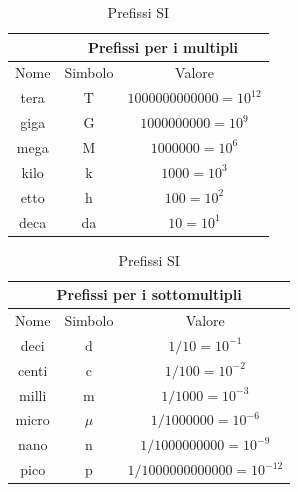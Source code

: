 \begin{table}
	\begin{center}
		\begin{tabular}{ccc}
			\toprule
			              & \multicolumn{2}{c}{ Prefissi per i multipli }                           \\
			\midrule
			Nome          & Simbolo                                       & Valore                  \\
			\midrule tera & $\mathrm{T}$                                  & $1000000000000=10^{12}$ \\
			giga          & $\mathrm{G}$                                  & $1000000000=10^9$       \\
			mega          & $\mathrm{M}$                                  & $1000000=10^6$          \\
			kilo          & $\mathrm{k}$                                  & $1000=10^3$             \\
			etto          & $\mathrm{h}$                                  & $100=10^2$              \\
			deca          & da                                            & $10=10^1$               \\
			\bottomrule
		\end{tabular}
		\vskip3mm
		\begin{tabular}{ccc}
			\toprule
			\multicolumn{3}{c}{ Prefissi per i sottomultipli }  \\
			\midrule
			Nome  & Simbolo      & Valore                       \\
			deci  & $\mathrm{d}$ & $1 / 10=10^{-1}$             \\
			centi & $\mathrm{c}$ & $1 / 100=10^{-2}$            \\
			milli & $\mathrm{m}$ & $1 / 1000=10^{-3}$           \\
			micro & $\mu$        & $1 / 1000000=10^{-6}$        \\
			nano  & $\mathrm{n}$ & $1 / 1000000000=10^{-9}$     \\
			pico  & $\mathrm{p}$ & $1 / 1000000000000=10^{-12}$ \\
			\bottomrule
		\end{tabular}
		\caption{Prefissi SI}
	\end{center}
\end{table}
\vskip3mm
